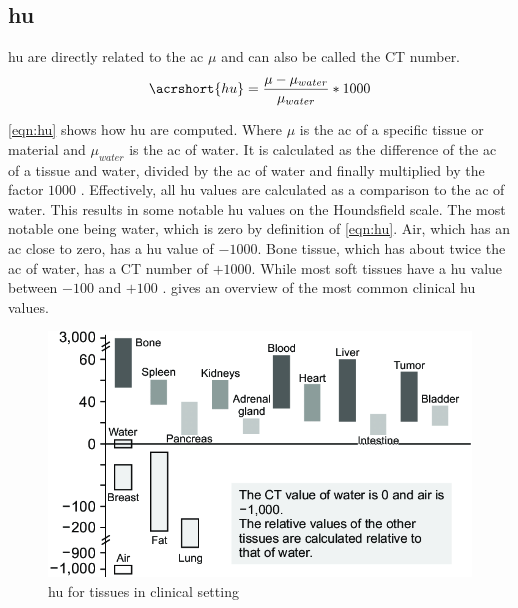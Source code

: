 \subsection{\acrfull{hu}}\label{s:b-hu}
\acrfull{hu} are directly related to the \acrfull{ac} $\mu$
and can also be called the CT number.
\begin{equation}
	\acrshort{hu} = \frac{\mu - \mu_{water}}{\mu_{water}}*1000
\end{equation}\label{eqn:hu}

\noindent
\cref{eqn:hu} shows how \acrshort{hu} are computed.
Where $\mu$ is the \acrlong{ac} of a specific tissue or material and $\mu_{water}$
is the \acrlong{ac} of water.
It is calculated as the difference of the \acrlong{ac} of a tissue and water,
divided by the \acrshort{ac} of water and finally multiplied by the factor $1000$ \cite{liMicrocomputedTomographySmall2008}.
Effectively, all \acrshort{hu} values are calculated as a comparison to the \acrlong{ac} of water.
This results in some notable \acrshort{hu} values on the Houndsfield scale.
The most notable one being water, which is zero by definition of \cref{eqn:hu}.
Air, which has an \acrlong{ac} close to zero, has a \acrshort{hu} value of $-1000$.
Bone tissue, which has about twice the \acrlong{ac} of water, has a CT number of $+1000$.
While most soft tissues have a \acrshort{hu} value between $-100$ and $+100$ \cite{liMicrocomputedTomographySmall2008}.
 gives an overview of the most common clinical \acrshort{hu} values.
\begin{figure}[h]
	\centerline{
		\includegraphics[scale=0.5]{images/huScale.png}}
	\caption{\acrshort{hu} for tissues in clinical setting \cite{jungBasicPhysicalPrinciples2021}}\label{fig:hu-scale}
\end{figure}


